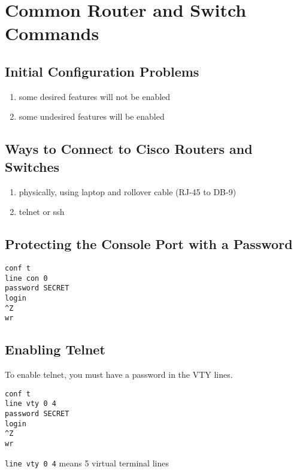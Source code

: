\section{Common Router and Switch Commands}

\subsection{Initial Configuration Problems}

\begin{enumerate}

\item some desired features will not be enabled
\item some undesired features will be enabled

\end{enumerate}

\subsection{Ways to Connect to Cisco Routers and Switches}

\begin{enumerate}

\item physically, using laptop and rollover cable (RJ-45 to DB-9)
\item telnet or ssh

\end{enumerate}

\subsection{Protecting the Console Port with a Password}

\begin{verbatim}
conf t
line con 0
password SECRET
login
^Z
wr
\end{verbatim}

\subsection{Enabling Telnet}

To enable telnet, you must have a password in the VTY lines.

\begin{verbatim}
conf t
line vty 0 4
password SECRET
login
^Z
wr
\end{verbatim}

\texttt{line vty 0 4} means 5 virtual terminal lines\\

